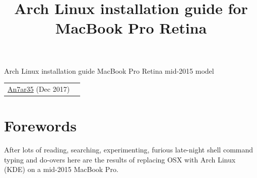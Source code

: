 
\title{Arch Linux installation guide for MacBook Pro Retina}
\color{dark}
\setlength{\parindent}{0em}
\setlength{\parskip}{0.5em}
\renewcommand{\baselinestretch}{1.2}


\sloppy
\begin{headerborder}
    \centering
    \begin{LARGE}
        Arch Linux installation guide\linebreak
        MacBook Pro Retina mid-2015 model\linebreak
        \raisebox{-0.2\height}{\openiconic[]}
        \par
    \end{LARGE}
    \begin{tabularx}{\textwidth}{lR}
        \href{https://an7ar35.bitbucket.io/}{ An7ar35} (Dec 2017) &
    \end{tabularx}
\end{headerborder}


    
\normalsize\justify
\tableofcontents
\clearpage

\section{Forewords}

After lots of reading, searching, experimenting, furious late-night shell command typing and 
do-overs here are the results of replacing OSX with Arch Linux (KDE) on a mid-2015 MacBook Pro. 

